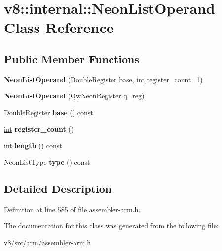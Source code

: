 \hypertarget{classv8_1_1internal_1_1NeonListOperand}{}\section{v8\+:\+:internal\+:\+:Neon\+List\+Operand Class Reference}
\label{classv8_1_1internal_1_1NeonListOperand}
\subsection*{Public Member Functions}
\begin{DoxyCompactItemize}
\item 
\mbox{\label{classv8_1_1internal_1_1NeonListOperand_a2f5a3b050f8d9c7e3f341ea63f547d66}} 
{\bfseries Neon\+List\+Operand} (\mbox{\hyperlink{classv8_1_1internal_1_1DoubleRegister}{Double\+Register}} base, \mbox{\hyperlink{classint}{int}} register\+\_\+count=1)
\item 
\mbox{\label{classv8_1_1internal_1_1NeonListOperand_a6f54c22046d7f76a0e754832cbcf6255}} 
{\bfseries Neon\+List\+Operand} (\mbox{\hyperlink{classv8_1_1internal_1_1QwNeonRegister}{Qw\+Neon\+Register}} q\+\_\+reg)
\item 
\mbox{\label{classv8_1_1internal_1_1NeonListOperand_a15e8ec71a73fd1c793abb35acd7f5d53}} 
\mbox{\hyperlink{classv8_1_1internal_1_1DoubleRegister}{Double\+Register}} {\bfseries base} () const
\item 
\mbox{\label{classv8_1_1internal_1_1NeonListOperand_a81738cec84de557307a9196f231ebdc4}} 
\mbox{\hyperlink{classint}{int}} {\bfseries register\+\_\+count} ()
\item 
\mbox{\label{classv8_1_1internal_1_1NeonListOperand_a34bd85f2c2802409d20f40fa9101aa7b}} 
\mbox{\hyperlink{classint}{int}} {\bfseries length} () const
\item 
\mbox{\label{classv8_1_1internal_1_1NeonListOperand_ad93381789031c1993e2408bb53487588}} 
Neon\+List\+Type {\bfseries type} () const
\end{DoxyCompactItemize}


\subsection{Detailed Description}


Definition at line 585 of file assembler-\/arm.\+h.



The documentation for this class was generated from the following file\+:\begin{DoxyCompactItemize}
\item 
v8/src/arm/assembler-\/arm.\+h\end{DoxyCompactItemize}
